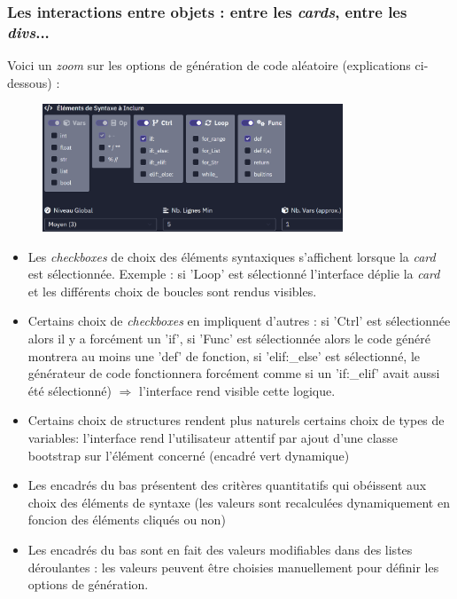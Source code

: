 \documentclass[11pt,a4paper]{article}
\begin{document}
\clearpage
\begin{minipage}{\textwidth}
\subsubsection{Les interactions entre objets : entre les \textit{cards}, entre les \textit{divs}...}
Voici un \textit{zoom} sur les options de génération de code aléatoire (explications ci-dessous) :
\begin{figure}[H]
    \centering
    \includegraphics[width=0.8\textwidth, keepaspectratio]{ui_choix.png}
    \label{ui_choix}
\end{figure}

\begin{itemize}
    \item Les \textit{checkboxes} de choix des éléments syntaxiques s'affichent lorsque la \textit{card} est sélectionnée. Exemple : si 'Loop' est sélectionné l'interface déplie la \textit{card} et les différents choix de boucles sont rendus visibles.
    \item Certains choix de \textit{checkboxes} en impliquent d'autres : si 'Ctrl' est sélectionnée alors il y a forcément un 'if', si 'Func' est sélectionnée alors le code généré montrera au moins une 'def' de fonction, si 'elif:\_else' est sélectionné, le générateur de code fonctionnera forcément comme si un 'if:\_elif' avait aussi été sélectionné) $\Rightarrow$ l'interface rend visible cette logique.
    \item Certains choix de structures rendent plus naturels certains choix de types de variables: l'interface rend l'utilisateur attentif par ajout d'une classe bootstrap sur l'élément concerné (encadré vert dynamique)
    \item Les encadrés du bas présentent des critères quantitatifs qui obéissent aux choix des éléments de syntaxe (les valeurs sont recalculées dynamiquement en foncion des éléments cliqués ou non)
    \item Les encadrés du bas sont en fait des valeurs modifiables dans des listes déroulantes : les valeurs peuvent être choisies manuellement pour définir les options de génération.
\end{itemize}

\end{minipage}
\end{document}
